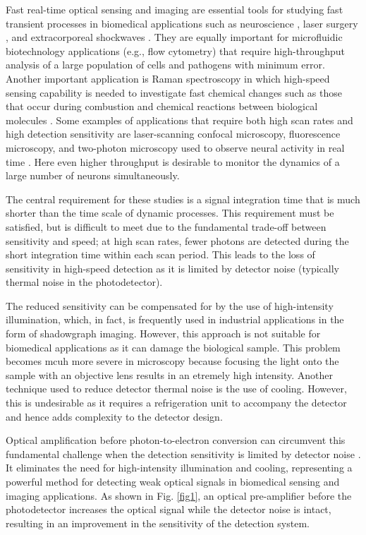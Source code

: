 \documentclass[10pt,letterpaper]{article}
\begin{document}
Fast real-time optical sensing and imaging are essential tools for studying fast transient processes in biomedical applications such as neuroscience \cite{ohki2005nature,golshani2009jneurosci}, laser surgery \cite{slade2002bantam}, and extracorporeal shockwaves \cite{delius2002eursurgres,riehle1987churchill}. They are equally important for microfluidic biotechnology applications (e.g., flow cytometry) \cite{goda2009nature,squires2005revmodphys,watson2004cambridgeunivpress} that require high-throughput analysis of a large population of cells and pathogens with minimum error. Another important application is Raman spectroscopy in which high-speed sensing capability is needed to investigate fast chemical changes such as those that occur during combustion \cite{hult2007optexpress} and chemical reactions between biological molecules \cite{epstein1998oxfordunivpress,petty2004biosystems,siesler2002wiley}. Some examples of applications that require both high scan rates and high detection sensitivity are laser-scanning confocal microscopy, fluorescence microscopy, and two-photon microscopy used to observe neural activity in real time \cite{diaspro2001wiley}. Here even higher throughput is desirable to monitor the dynamics of a large number of neurons simultaneously. 

The central requirement for these studies is a signal integration time that is much shorter than the time scale of dynamic processes. This requirement must be satisfied, but is difficult to meet due to the fundamental trade-off between sensitivity and speed; at high scan rates, fewer photons are detected during the short integration time within each scan period. This leads to the loss of sensitivity in high-speed detection as it is limited by detector noise (typically thermal noise in the photodetector). 

The reduced sensitivity can be compensated for by the use of high-intensity illumination, which, in fact, is frequently used in industrial applications in the form of shadowgraph imaging. However, this approach is not suitable for biomedical applications as it can damage the biological sample. This problem becomes mcuh more severe in microscopy because focusing the light onto the sample with an objective lens results in an etremely high intensity. Another technique used to reduce detector thermal noise is the use of cooling. However, this is undesirable as it requires a refrigeration unit to accompany the detector and hence adds complexity to the detector design. 

Optical amplification before photon-to-electron conversion can circumvent this fundamental challenge when the detection sensitivity is limited by detector noise \cite{goda2009nature, goda2008applphyslett, goda2008physreva, tsia2010optexpress}. It eliminates the need for high-intensity illumination and cooling, representing a powerful method for detecting weak optical signals in biomedical sensing and imaging applications. As shown in Fig. \ref{fig1}, an optical pre-amplifier before the photodetector increases the optical signal while the detector noise is intact, resulting in an improvement in the sensitivity of the detection system. 
\end{document}
